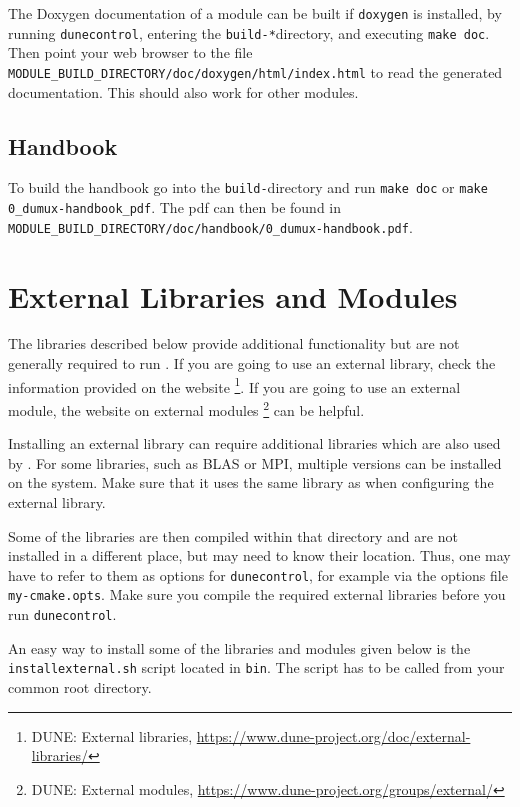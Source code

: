 The Doxygen documentation of a module can be built if \texttt{doxygen} is installed,
by running \texttt{dunecontrol}, entering the \texttt{build-*}directory, and executing
\texttt{make doc}. Then point your web browser to the file
\texttt{MODULE\_BUILD\_DIRECTORY/doc/doxygen/html/index.html} to read the generated documentation.
This should also work for other \Dune modules.

\subsection{Handbook}
To build the \Dumux handbook go into the \texttt{build-}directory and
run \texttt{make doc} or \texttt{make 0\_dumux-handbook\_pdf}. The pdf can then be found
in \texttt{MODULE\_BUILD\_DIRECTORY/doc/handbook/0\_dumux-handbook.pdf}.

\section{External Libraries and Modules} \label{sec:external-modules-libraries}
The libraries described below provide additional functionality but are not generally required to run \Dumux.
If you are going to use an external library, check the information provided on the \Dune website%
\footnote{DUNE: External libraries, \url{https://www.dune-project.org/doc/external-libraries/}}.
If you are going to use an external \Dune module, the website on external modules%
\footnote{DUNE: External modules, \url{https://www.dune-project.org/groups/external/}}
can be helpful.

Installing an external library can require additional libraries which are also used by \Dune.
For some libraries, such as BLAS or MPI, multiple versions can be installed on the system.
Make sure that it uses the same library as \Dune when configuring the external library.

Some of the libraries are then compiled within that directory and are not installed in
a different place, but \Dune may need to know their location. Thus, one may have to refer to
them as options for \texttt{dunecontrol}, for example via the options file \texttt{my-cmake.opts}.
Make sure you compile the required external libraries before you run \texttt{dunecontrol}.

An easy way to install some of the libraries and modules given below is the
\texttt{installexternal.sh} script located in \texttt{bin}. The script
has to be called from your common root directory.


